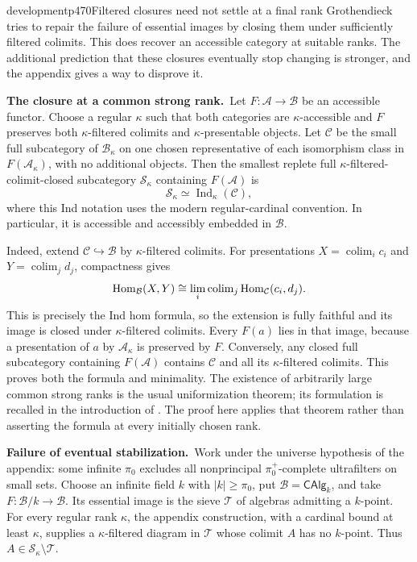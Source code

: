 \begin{dcomment}{development}{p470}{Filtered closures need not settle at a final rank}
Grothendieck tries to repair the failure of essential images by closing them under sufficiently filtered colimits. This does recover an accessible category at suitable ranks. The additional prediction that these closures eventually stop changing is stronger, and the appendix gives a way to disprove it.

\textbf{The closure at a common strong rank.}\ours\
Let $F:\mathcal A\to\mathcal B$ be an accessible functor. Choose a regular $\kappa$ such that both categories are $\kappa$-accessible and $F$ preserves both $\kappa$-filtered colimits and $\kappa$-presentable objects. Let $\mathcal C$ be the small full subcategory of $\mathcal B_\kappa$ on one chosen representative of each isomorphism class in $F(\mathcal A_\kappa)$, with no additional objects. Then the smallest replete full $\kappa$-filtered-colimit-closed subcategory $\mathcal S_\kappa$ containing $F(\mathcal A)$ is
\[
 \mathcal S_\kappa\simeq\operatorname{Ind}_\kappa(\mathcal C),
\]
where this Ind notation uses the modern regular-cardinal convention. In particular, it is accessible and accessibly embedded in $\mathcal B$.

Indeed, extend $\mathcal C\hookrightarrow\mathcal B$ by $\kappa$-filtered colimits. For presentations $X=\operatorname{colim}_i c_i$ and $Y=\operatorname{colim}_j d_j$, compactness gives
\[
 \operatorname{Hom}_{\mathcal B}(X,Y)
 \cong\lim_i\operatorname{colim}_j\operatorname{Hom}_{\mathcal C}(c_i,d_j).
\]
This is precisely the Ind hom formula, so the extension is fully faithful and its image is closed under $\kappa$-filtered colimits. Every $F(a)$ lies in that image, because a presentation of $a$ by $\mathcal A_\kappa$ is preserved by $F$. Conversely, any closed full subcategory containing $F(\mathcal A)$ contains $\mathcal C$ and all its $\kappa$-filtered colimits. This proves both the formula and minimality. The existence of arbitrarily large common strong ranks is the usual uniformization theorem; its formulation is recalled in the introduction of \citet{PareRosicky2013}. The proof here applies that theorem rather than asserting the formula at every initially chosen rank.

\textbf{Failure of eventual stabilization.}\ours\
Work under the universe hypothesis of the appendix: some infinite $\pi_0$ excludes all nonprincipal $\pi_0^+$-complete ultrafilters on small sets. Choose an infinite field $k$ with $|k|\ge\pi_0$, put $\mathcal B=\mathsf{CAlg}_k$, and take $F:\mathcal B/k\to\mathcal B$. Its essential image is the sieve $\mathcal T$ of algebras admitting a $k$-point. For every regular rank $\kappa$, the appendix construction, with a cardinal bound at least $\kappa$, supplies a $\kappa$-filtered diagram in $\mathcal T$ whose colimit $A$ has no $k$-point. Thus $A\in\mathcal S_\kappa\setminus\mathcal T$.


\end{dcomment}
